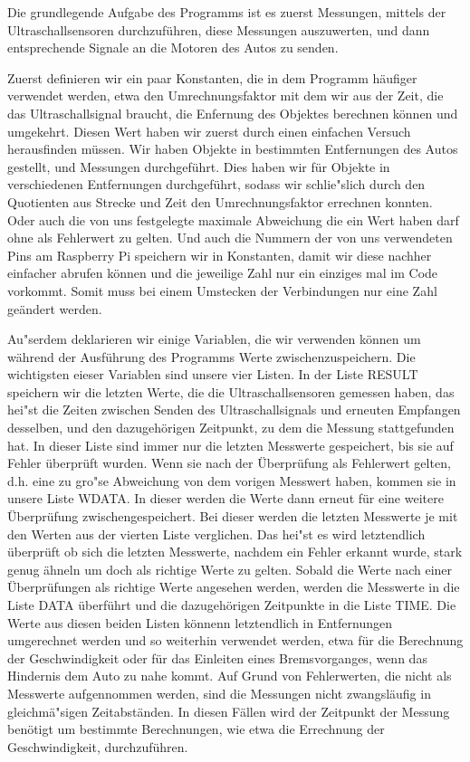 \documentclass[a4paper,12pt]{article}
\begin{document}
Die grundlegende Aufgabe des Programms ist es zuerst Messungen, mittels der Ultraschallsensoren durchzuf\"uhren, diese Messungen auszuwerten, und dann entsprechende Signale an die Motoren des Autos zu senden.

\medskip

Zuerst definieren wir ein paar Konstanten, die in dem Programm h\"aufiger verwendet werden, etwa den Umrechnungsfaktor mit dem wir aus der Zeit, die das Ultraschallsignal braucht, die Enfernung des Objektes berechnen k\"onnen und umgekehrt.
Diesen Wert haben wir zuerst durch einen einfachen Versuch herausfinden m\"ussen. Wir haben Objekte in bestimmten Entfernungen des Autos gestellt, und Messungen durchgef\"uhrt.
Dies haben wir f\"ur Objekte in verschiedenen Entfernungen durchgef\"uhrt, sodass wir schlie"slich durch den Quotienten aus Strecke und Zeit den Umrechnungsfaktor errechnen konnten.
Oder auch die von uns festgelegte maximale Abweichung die ein Wert haben darf ohne als Fehlerwert zu gelten.
Und auch die Nummern der von uns verwendeten Pins am Raspberry Pi speichern wir in Konstanten, damit wir diese nachher einfacher abrufen k\"onnen und die jeweilige Zahl nur ein einziges mal im Code vorkommt.
Somit muss bei einem Umstecken der Verbindungen nur eine Zahl ge\"andert werden.

Au"serdem deklarieren wir einige Variablen, die wir verwenden k\"onnen um w\"ahrend der Ausf\"uhrung des Programms Werte zwischenzuspeichern.
Die wichtigsten eieser Variablen sind unsere vier Listen.
In der Liste RESULT speichern wir die letzten Werte, die die Ultraschallsensoren gemessen haben, das hei"st die Zeiten zwischen Senden des Ultraschallsignals und erneuten Empfangen desselben, und den dazugeh\"origen Zeitpunkt, zu dem die Messung stattgefunden hat.
In dieser Liste sind immer nur die letzten Messwerte gespeichert, bis sie auf Fehler \"uberpr\"uft wurden.
Wenn sie nach der \"Uberpr\"ufung als Fehlerwert gelten, d.h. eine zu gro"se Abweichung von dem vorigen Messwert haben, kommen sie in unsere Liste WDATA.
In dieser werden die Werte dann erneut f\"ur eine weitere \"Uberpr\"ufung zwischengespeichert.
Bei dieser werden die letzten Messwerte je mit den Werten aus der vierten Liste verglichen.
Das hei"st es wird letztendlich \"uberpr\"uft ob sich die letzten Messwerte, nachdem ein Fehler erkannt wurde, stark genug \"ahneln um doch als richtige Werte zu gelten.
Sobald die Werte nach einer \"Uberpr\"ufungen als richtige Werte angesehen werden, werden die Messwerte in die Liste DATA \"uberf\"uhrt und die dazugeh\"origen Zeitpunkte in die Liste TIME.
Die Werte aus diesen beiden Listen k\"onnenn letztendlich in Entfernungen umgerechnet werden und so weiterhin verwendet werden, etwa f\"ur die Berechnung der Geschwindigkeit oder f\"ur das Einleiten eines Bremsvorganges, wenn das Hindernis dem Auto zu nahe kommt.
Auf Grund von Fehlerwerten, die nicht als Messwerte aufgennommen werden, sind die Messungen nicht zwangsl\"aufig in gleichm\"a"sigen Zeitabst\"anden. In diesen F\"allen wird der Zeitpunkt der Messung ben\"otigt um bestimmte Berechnungen, wie etwa die Errechnung der Geschwindigkeit, durchzuf\"uhren.
\end{document}
